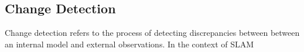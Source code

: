 \subsection{Change Detection}

Change detection refers to the process of detecting discrepancies between between an internal model and external observations. In the context of SLAM